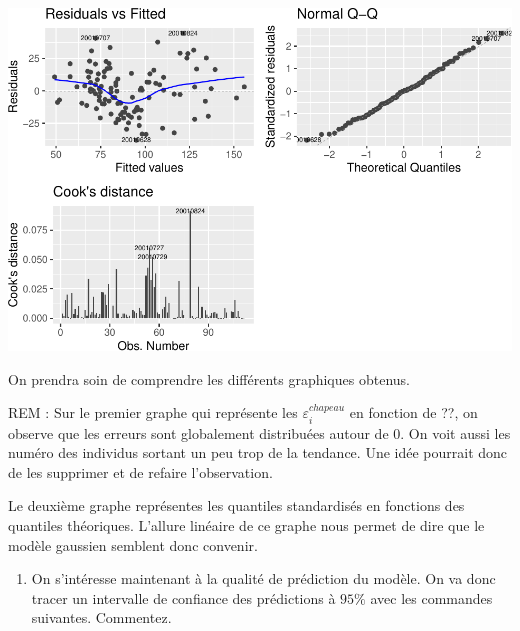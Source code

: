 \documentclass[
]{article}
\providecommand{\tightlist}{%
  \setlength{\itemsep}{0pt}\setlength{\parskip}{0pt}}
\begin{document}
\includegraphics{TP-ML-Regression_files/figure-latex/unnamed-chunk-13-1.pdf}

On prendra soin de comprendre les différents graphiques obtenus.

REM : Sur le premier graphe qui représente les
\(\varepsilon^{chapeau}_i\) en fonction de ??, on observe que les
erreurs sont globalement distribuées autour de 0. On voit aussi les
numéro des individus sortant un peu trop de la tendance. Une idée
pourrait donc de les supprimer et de refaire l'observation.

Le deuxième graphe représentes les quantiles standardisés en fonctions
des quantiles théoriques. L'allure linéaire de ce graphe nous permet de
dire que le modèle gaussien semblent donc convenir.

\begin{enumerate}
\def\labelenumi{\arabic{enumi}.}
\setcounter{enumi}{4}
\tightlist
\item
  On s'intéresse maintenant à la qualité de prédiction du modèle. On va
  donc tracer un intervalle de confiance des prédictions à \(95\%\) avec
  les commandes suivantes. Commentez.
\end{enumerate}
\end{document}
